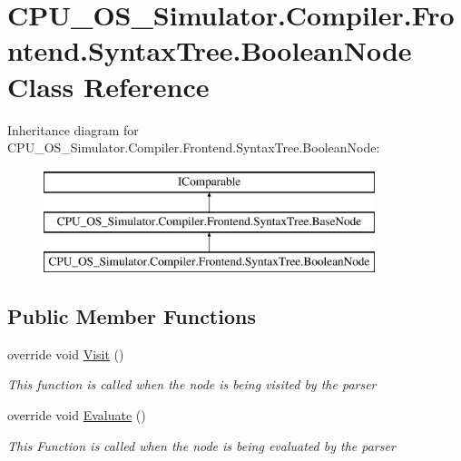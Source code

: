 \hypertarget{class_c_p_u___o_s___simulator_1_1_compiler_1_1_frontend_1_1_syntax_tree_1_1_boolean_node}{}\section{C\+P\+U\+\_\+\+O\+S\+\_\+\+Simulator.\+Compiler.\+Frontend.\+Syntax\+Tree.\+Boolean\+Node Class Reference}
\label{class_c_p_u___o_s___simulator_1_1_compiler_1_1_frontend_1_1_syntax_tree_1_1_boolean_node}
Inheritance diagram for C\+P\+U\+\_\+\+O\+S\+\_\+\+Simulator.\+Compiler.\+Frontend.\+Syntax\+Tree.\+Boolean\+Node\+:\begin{figure}[H]
\begin{center}
\leavevmode
\includegraphics[height=3.000000cm]{class_c_p_u___o_s___simulator_1_1_compiler_1_1_frontend_1_1_syntax_tree_1_1_boolean_node}
\end{center}
\end{figure}
\subsection*{Public Member Functions}
\begin{DoxyCompactItemize}
\item 
override void \hyperlink{class_c_p_u___o_s___simulator_1_1_compiler_1_1_frontend_1_1_syntax_tree_1_1_boolean_node_a5cf13a08d798c5c1a225654e3f888866}{Visit} ()
\begin{DoxyCompactList}\small\item\em This function is called when the node is being visited by the parser \end{DoxyCompactList}\item 
override void \hyperlink{class_c_p_u___o_s___simulator_1_1_compiler_1_1_frontend_1_1_syntax_tree_1_1_boolean_node_a4a804a07050c45ca80feaaac3a050784}{Evaluate} ()
\begin{DoxyCompactList}\small\item\em This Function is called when the node is being evaluated by the parser \end{DoxyCompactList}\end{DoxyCompactItemize}
